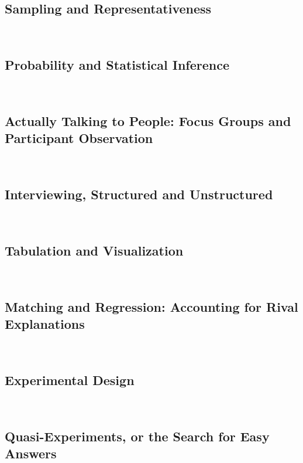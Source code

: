 \documentclass[12pt,a4paper]{article}
\newcommand{\lecture}[3][\DefaultOpt]{%
  \def\DefaultOpt{#2}%
  \clearpage\subsection[#1]{#2}\emph{#3}\vspace{.25em}\\
}
\newcommand{\reading}[2][]{\noindent -- {#1}\bibentry{#2}.\vspace{.25em}\\}
\begin{document}

\lecture{Sampling and Representativeness}{}

\lecture{Probability and Statistical Inference}{}

\lecture{Actually Talking to People: Focus Groups and Participant Observation}{}


\lecture{Interviewing, Structured and Unstructured}{}

\lecture{Tabulation and Visualization}{}

\lecture{Matching and Regression: Accounting for Rival Explanations}{}

\lecture{Experimental Design}{}



\lecture{Quasi-Experiments, or the Search for Easy Answers}{} %
\end{document}
